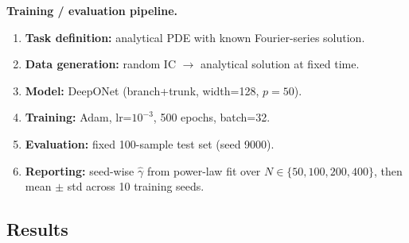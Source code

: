 \documentclass[12pt,a4paper]{article}
\begin{document}
\textbf{Training / evaluation pipeline.}
\begin{enumerate}
    \item \textbf{Task definition:} analytical PDE with known Fourier-series solution.
    \item \textbf{Data generation:} random IC $\to$ analytical solution at fixed time.
    \item \textbf{Model:} DeepONet (branch+trunk, width=128, $p=50$).
    \item \textbf{Training:} Adam, lr=$10^{-3}$, 500 epochs, batch=32.
    \item \textbf{Evaluation:} fixed 100-sample test set (seed 9000).
    \item \textbf{Reporting:} seed-wise $\hat\gamma$ from power-law fit over
        $N \in \{50,100,200,400\}$, then mean $\pm$ std across 10 training seeds.
\end{enumerate}

\subsection{Results}
\end{document}
